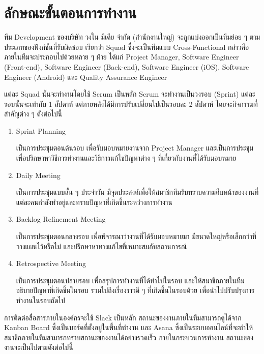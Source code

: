 \section{ลักษณะขั้นตอนการทำงาน}
ทีม Development ของบริษัท วงใน มีเดีย จำกัด (สำนักงานใหญ่) จะถูกแบ่งออกเป็นทีมย่อย ๆ ตามประเภทของฟังก์ชันที่รับผิดชอบ เรียกว่า Squad ซึ่งจะเป็นทีมแบบ Cross-Functional กล่าวคือ ภายในทีมจะประกอบไปด้วยหลาย ๆ ฝ่าย ได้แก่ Project Manager, Software Engineer (Front-end), Software Engineer (Back-end), Software Engineer (iOS), Software Engineer (Android) และ Quality Assurance Engineer

แต่ละ Squad นั้นจะทำงานโดยใช้ Scrum เป็นหลัก Scrum จะทำงานเป็นวงรอบ (Sprint) แต่ละรอบนั้นจะเท่ากับ 1 สัปดาห์ แต่ภายหลังได้มีการปรับเปลี่ยนไปเป็นรอบละ 2 สัปดาห์ โดยจะกิจกรรมที่สำคัญต่าง ๆ ดังต่อไปนี้
\begin{enumerate}
	\item Sprint Planning
	
	เป็นการประชุมตอนต้นรอบ เพื่อรับมอบหมายงานจาก Project Manager และเป็นการประชุมเพื่อปรึกษาหาวิธีการทำงานและวิธีการแก้ไขปัญหาต่าง ๆ ที่เกี่ยวกับงานที่ได้รับมอบหมาย
	
	\item Daily Meeting
	
	เป็นการประชุมแบบสั้น ๆ ประจำวัน มีจุดประสงค์เพื่อให้สมาชิกทีมรับทราบความคืบหน้าของงานที่แต่ละคนกำลังทำอยู่และทราบปัญหาที่เกิดขึ้นระหว่างการทำงาน
	
	\item Backlog Refinement Meeting
	
	เป็นการประชุมตอนกลางรอบ เพื่อพิจารณาว่างานที่ได้รับมอบหมายมา มีขนาดใหญ่หรือเล็กกว่าที่วางแผนไว้หรือไม่ และปรึกษาหาทางแก้ไขที่เหมาะสมกับสถานการณ์
	
	\item Retrospective Meeting
	
	เป็นการประชุมตอนปลายรอบ เพื่อสรุปการทำงานที่ได้ทำไปในรอบ และให้สมาชิกภายในทีมอธิบายปัญหาที่เกิดขึ้นในรอบ รวมไปถึงเรื่องราวดี ๆ ที่เกิดขึ้นในรอบด้วย เพื่อนำไปปรับปรุงการทำงานในรอบถัดไป
\end{enumerate}

การติดต่อสื่อสารภายในองค์กรจะใช้ Slack เป็นหลัก สถานะของงานภายในทีมสามารถดูได้จาก Kanban Board ซึ่งเป็นบอร์ดที่ตั้งอยู่ในพื้นที่ทำงาน และ Asana ซึ่งเป็นระบบออนไลน์ที่จะทำให้สมาชิกภายในทีมสามารถทราบสถานะของงานได้อย่างรวดเร็ว ภายในกระบวนการทำงาน สถานะของงานจะเป็นไปตามดังต่อไปนี้

